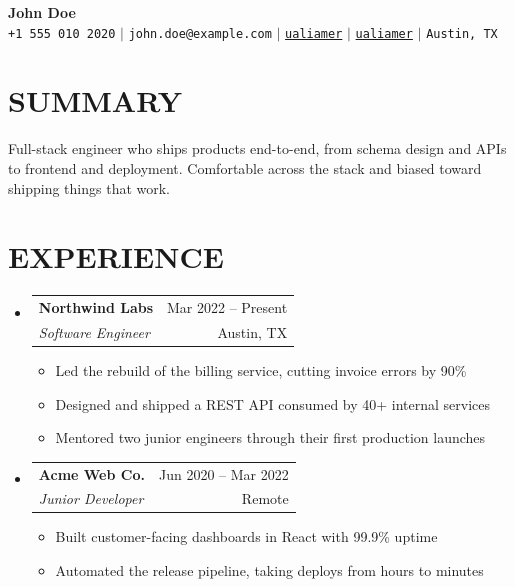 \documentclass[letterpaper,11pt]{article}
\makeatletter
\newcommand{\resumeItem}[1]{\item\small{{#1 \vspace{-1pt}}}}
\newcommand{\resumeSubheading}[4]{\vspace{-1pt}\item
  \begin{tabular*}{\textwidth}[t]{l@{\extracolsep{\fill}}r}
    \textbf{#1} & {\color{dark-grey}\small #2}\vspace{1pt}\\
    \textit{#3} & {\color{dark-grey} \small #4}\\
  \end{tabular*}\vspace{-4pt}}
\newcommand{\resumeSubHeadingListStart}{\begin{itemize}[leftmargin=0in, label={}]}
\newcommand{\resumeSubHeadingListEnd}{\end{itemize}}
\newcommand{\resumeItemListStart}{\begin{itemize}}
\newcommand{\resumeItemListEnd}{\end{itemize}\vspace{0pt}}
\makeatother
\begin{document}
\begin{center}
    \textbf{\Huge John Doe} \\ \vspace{5pt}
    \small \faPhone* \texttt{+1 555 010 2020} \hspace{1pt} $|$ \hspace{1pt} \faEnvelope \hspace{2pt} \texttt{john.doe@example.com} \hspace{1pt} $|$ \hspace{1pt} \faLinkedin \hspace{2pt} \href{https://www.linkedin.com/in/ualiamer}{\texttt{ualiamer}} \hspace{1pt} $|$ \hspace{1pt} \faGithub \hspace{2pt} \href{https://github.com/ualiamer}{\texttt{ualiamer}} \hspace{1pt} $|$ \hspace{1pt} \faMapMarker* \hspace{2pt}\texttt{Austin, TX}
    \\ \vspace{-3pt}
\end{center}

\section{SUMMARY}
\small{Full-stack engineer who ships products end-to-end, from schema design and APIs to frontend and deployment. Comfortable across the stack and biased toward shipping things that work.}
\vspace{4pt}

\section{EXPERIENCE}
  \resumeSubHeadingListStart
    \resumeSubheading
      {Northwind Labs}{Mar 2022 -- Present}
      {Software Engineer}{Austin, TX}
      \resumeItemListStart
        \resumeItem{Led the rebuild of the billing service, cutting invoice errors by 90\%}
        \resumeItem{Designed and shipped a REST API consumed by 40+ internal services}
        \resumeItem{Mentored two junior engineers through their first production launches}
      \resumeItemListEnd
    \resumeSubheading
      {Acme Web Co.}{Jun 2020 -- Mar 2022}
      {Junior Developer}{Remote}
      \resumeItemListStart
        \resumeItem{Built customer-facing dashboards in React with 99.9\% uptime}
        \resumeItem{Automated the release pipeline, taking deploys from hours to minutes}
      \resumeItemListEnd
  \resumeSubHeadingListEnd
\end{document}
